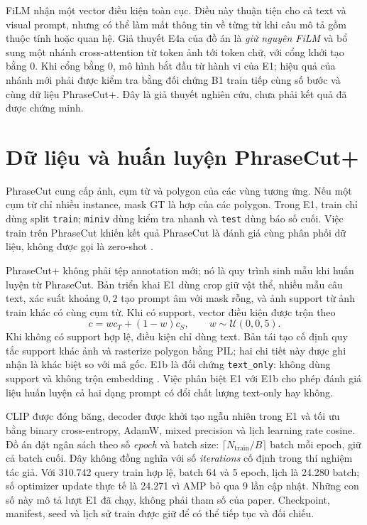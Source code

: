 FiLM nhận một vector điều kiện toàn cục. Điều này thuận tiện cho cả text và visual prompt, nhưng có thể làm mất thông tin về từng từ khi câu mô tả gồm thuộc tính hoặc quan hệ. Giả thuyết E4a của đồ án là \emph{giữ nguyên FiLM} và bổ sung một nhánh cross-attention từ token ảnh tới token chữ, với cổng khởi tạo bằng $0$. Khi cổng bằng $0$, mô hình bắt đầu từ hành vi của E1; hiệu quả của nhánh mới phải được kiểm tra bằng đối chứng B1 train tiếp cùng số bước và cùng dữ liệu PhraseCut+. Đây là giả thuyết nghiên cứu, chưa phải kết quả đã được chứng minh.

\section{Dữ liệu và huấn luyện PhraseCut+}
PhraseCut cung cấp ảnh, cụm từ và polygon của các vùng tương ứng. Nếu một cụm từ chỉ nhiều instance, mask GT là hợp của các polygon. Trong E1, train chỉ dùng split \texttt{train}; \texttt{miniv} dùng kiểm tra nhanh và \texttt{test} dùng báo số cuối. Việc train trên PhraseCut khiến kết quả PhraseCut là đánh giá cùng phân phối dữ liệu, không được gọi là zero-shot \cite{luddecke2022clipseg,clipsegcode}.

PhraseCut+ không phải tệp annotation mới; nó là quy trình sinh mẫu khi huấn luyện từ PhraseCut. Bản triển khai E1 dùng crop giữ vật thể, nhiều mẫu câu text, xác suất khoảng $0{,}2$ tạo prompt âm với mask rỗng, và ảnh support từ ảnh train khác có cùng cụm từ. Khi có support, vector điều kiện được trộn theo
\begin{equation}
  c=w c_T+(1-w)c_S,\qquad w\sim\mathcal{U}(0,0{,}5).
  \label{eq:promptmix}
\end{equation}
Khi không có support hợp lệ, điều kiện chỉ dùng text. Bản tái tạo cố định quy tắc support khác ảnh và rasterize polygon bằng PIL; hai chi tiết này được ghi nhận là khác biệt so với mã gốc. E1b là đối chứng \texttt{text\_only}: không dùng support và không trộn embedding \cite{clipsegcode}. Việc phân biệt E1 với E1b cho phép đánh giá liệu huấn luyện cả hai dạng prompt có đổi chất lượng text-only hay không.

CLIP được đóng băng, decoder được khởi tạo ngẫu nhiên trong E1 và tối ưu bằng binary cross-entropy, AdamW, mixed precision và lịch learning rate cosine. Đồ án đặt ngân sách theo số \emph{epoch} và batch size: $\lceil N_{\mathrm{train}}/B\rceil$ batch mỗi epoch, giữ cả batch cuối. Đây không đồng nghĩa với số \emph{iterations} cố định trong thí nghiệm tác giả. Với 310.742 query train hợp lệ, batch 64 và 5 epoch, lịch là 24.280 batch; số optimizer update thực tế là 24.271 vì AMP bỏ qua 9 lần cập nhật. Những con số này mô tả lượt E1 đã chạy, không phải tham số của paper. Checkpoint, manifest, seed và lịch sử train được giữ để có thể tiếp tục và đối chiếu.

